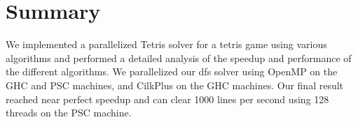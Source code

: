 
\section{Summary}

We implemented a parallelized Tetris solver for a tetris game using various algorithms and performed a detailed analysis of the speedup and performance of the different algorithms. We  parallelized our dfs solver using OpenMP on the GHC and PSC machines, and CilkPlus on the GHC machines. Our final result reached near perfect speedup and can clear 1000 lines per second using 128 threads on the PSC machine. 





